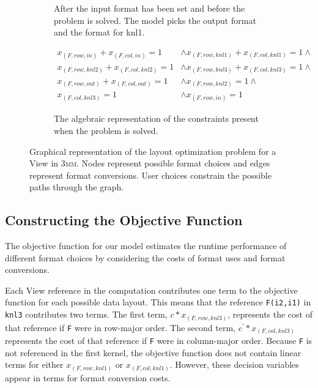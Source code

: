 \documentclass[sigconf,review=true]{acmart}
\begin{document}
\begin{figure}
\begin{subfigure}[t]{0.2\textwidth}
		\caption{After the input format has been set and before the problem is solved. The model picks the output format and the format for knl1.}
		\label{graphModel:4}
	\end{subfigure}

	\vspace{5px}

	\begin{subfigure}{0.45\textwidth}
		\begin{align*}
			x_{(F,row,in)} + x_{(F,col,in)} = 1 &\wedge 
		x_{(F,row,knl1)} + x_{(F,col,knl1)} = 1 \wedge \\
		x_{(F,row,knl2)} + x_{(F,col,knl2)} = 1 &\wedge 
		x_{(F,row,knl3)} + x_{(F,col,knl3)} = 1 \wedge \\
		x_{(F,row,out)} + x_{(F,col,out)} = 1 &\wedge 
		x_{(F,row,knl2)} = 1 \wedge\\
		 x_{(F,col,knl3)} = 1 &\wedge x_{(F,row,in)} = 1
		\end{align*}
		
		\caption{The algebraic representation of the constraints present when the problem is solved.}
		\label{graphModel:5}
	\end{subfigure}

	\caption{Graphical representation of the layout optimization problem for a View in \textsc{3mm}. Nodes represent possible format choices and edges represent format conversions. User choices constrain the possible paths through the graph.}
	\label{graphModel}
\end{figure}

\subsection{Constructing the Objective Function}

The objective function for our model estimates the runtime performance of different format choices by considering the costs of format uses and format conversions.

Each View reference in the computation contributes one term to the objective function for each possible data layout. This means that the reference \verb.F(i2,i1). in \verb.knl3.  contributes two terms.
The first term,  $c * x_{(F,row,knl3)}$,  represents the cost of that reference if \verb.F. were in row-major order. 
The second term, $c^\prime * x_{(F,col,knl3)}$  represents the cost of that reference if \verb.F. were in column-major order.
Because \verb.F. is not referenced in the first kernel, the objective function does not contain linear terms for either $x_{(F,row,knl1)}$ or $x_{(F,col,knl1)}$.
However, these decision variables appear in terms for format conversion costs.
\end{document}
